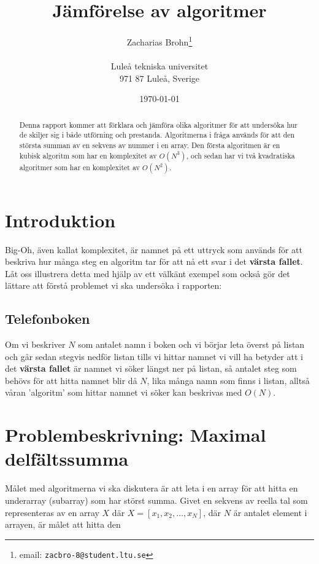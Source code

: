 \documentclass[a4paper,12pt]{article} \usepackage[swedish]{babel}
\title{Jämförelse av algoritmer}
\author{Zacharias Brohn\thanks{email:
        \texttt{zacbro-8@student.ltu.se}}\\  ~ \\ Luleå tekniska universitet \\
        971 87 Luleå, Sverige}
\date{\today}
\begin{document}
 \linenumbers %
        \begin{abstract} Denna rapport kommer att förklara och jämföra olika
            algoritmer för att undersöka hur de skiljer sig i både utförning
            och prestanda. Algoritmerna i fråga används för att den största
            summan av en sekvens av nummer i en array. Den första algoritmen är
            en kubisk algoritm som har en komplexitet av $O\left(N^3\right)$,
            och sedan har vi två kvadratiska algoritmer som har en komplexitet
        av $O\left(N^2\right)$. \end{abstract}
        \section{Introduktion} \label{sec:introduktion} Big-Oh, även kallat
        komplexitet, är namnet på ett uttryck som används för att beskriva
        hur många steg en algoritm tar för att nå ett svar i det
        \textbf{värsta fallet}. Låt oss illustrera detta med hjälp av ett
        välkänt exempel som också gör det lättare att förstå problemet vi
        ska undersöka i rapporten: \subsection*{Telefonboken} Om vi
        beskriver $N$ som antalet namn i boken och vi börjar leta överst på
        listan och går sedan stegvis nedför listan tills vi hittar namnet
        vi vill ha betyder att i det \textbf{värsta fallet} är namnet vi
        söker längst ner på listan, så antalet steg som behövs för att
        hitta namnet blir då $N$, lika många namn som finns i listan,
        alltså våran 'algoritm' som hittar namnet vi söker kan beskrivas
        med $O\left(N\right)$.
        \newpage \section{Problembeskrivning: Maximal delfältssumma}
        \label{sec:problembeskrivning} Målet med algoritmerna vi ska
        diskutera är att leta i en array för att hitta en underarray
        (subarray) som har störst summa. Givet en sekvens av reella tal som
        representeras av en array $X$ där $X = [x_1, x_2, \ldots, x_N]$,
        där $N$ är antalet element i arrayen, är målet att hitta den
\end{document}
